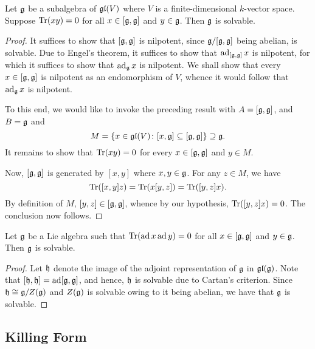 \begin{theorem}
    Let $\mathfrak{g}$ be a subalgebra of $\mathfrak{gl}(V)$ where $V$ is a finite-dimensional $k$-vector space. Suppose $\operatorname{Tr}(xy) = 0$ for all $x\in [\mathfrak{g},\mathfrak{g}]$ and $y\in\mathfrak{g}$. Then $\mathfrak{g}$ is solvable.
\end{theorem}
\begin{proof}
    It suffices to show that $[\mathfrak{g},\mathfrak{g}]$ is nilpotent, since $\mathfrak{g}/[\mathfrak{g},\mathfrak{g}]$ being abelian, is solvable. Due to Engel's theorem, it suffices to show that $\operatorname{ad}_{[\mathfrak{g},\mathfrak{g}]} x$ is nilpotent, for which it suffices to show that $\operatorname{ad}_{\mathfrak{g}} x$ is nilpotent. We shall show that every $x\in[\mathfrak{g},\mathfrak{g}]$ is nilpotent as an endomorphism of $V$, whence it would follow that $\operatorname{ad}_{\mathfrak{g}} x$ is nilpotent.

    To this end, we would like to invoke the preceding result with $A = [\mathfrak{g},\mathfrak{g}]$, and $B = \mathfrak{g}$ and 
    \begin{equation*}
        M = \{x\in\mathfrak{gl}(V)\colon [x,\mathfrak{g}]\subseteq[\mathfrak{g},\mathfrak{g}]\}\supseteq\mathfrak{g}.
    \end{equation*}
    It remains to show that $\operatorname{Tr}(xy) = 0$ for every $x\in[\mathfrak{g},\mathfrak{g}]$ and $y\in M$.

    Now, $[\mathfrak{g},\mathfrak{g}]$ is generated by $[x, y]$ where $x,y\in\mathfrak{g}$. For any $z\in M$, we have 
    \begin{equation*}
        \operatorname{Tr}([x, y]z) = \operatorname{Tr}(x[y, z]) = \operatorname{Tr}([y, z]x).
    \end{equation*}
    By definition of $M$, $[y, z]\in[\mathfrak{g},\mathfrak{g}]$, whence by our hypothesis, $\operatorname{Tr}([y, z]x) = 0$. The conclusion now follows.
\end{proof}

\begin{corollary}
    Let $\mathfrak{g}$ be a Lie algebra such that $\operatorname{Tr}(\operatorname{ad} x\operatorname{ad} y) = 0$ for all $x\in[\mathfrak{g},\mathfrak{g}]$ and $y\in\mathfrak{g}$. Then $\mathfrak{g}$ is solvable.
\end{corollary}
\begin{proof}
    Let $\mathfrak{h}$ denote the image of the adjoint representation of $\mathfrak{g}$ in $\mathfrak{gl}(\mathfrak{g})$. Note that $[\mathfrak{h},\mathfrak{h}] = \operatorname{ad}[\mathfrak{g},\mathfrak{g}]$, and hence, $\mathfrak{h}$ is solvable due to Cartan's criterion. Since $\mathfrak{h}\cong\mathfrak{g}/ Z(\mathfrak{g})$ and $Z(\mathfrak{g})$ is solvable owing to it being abelian, we have that $\mathfrak{g}$ is solvable.
\end{proof}

\subsection{Killing Form}

